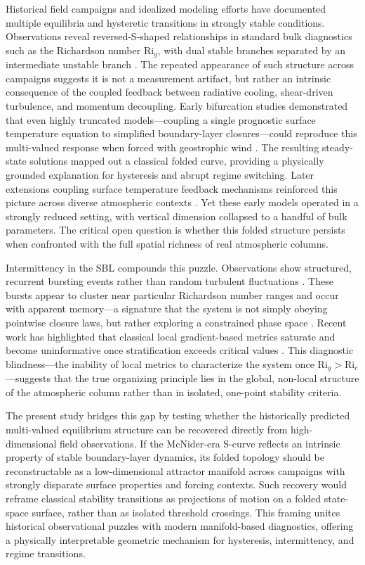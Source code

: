 \documentclass[12pt,a4paper]{article}
\newcommand{\Ric}{\mathrm{Ri}_c}
\newcommand{\Rig}{\mathrm{Ri}_g}
\begin{document}
Historical field campaigns and idealized modeling efforts have documented multiple equilibria and hysteretic transitions in strongly stable conditions. Observations reveal reversed-S-shaped relationships in standard bulk diagnostics such as the Richardson number $\Rig$, with dual stable branches separated by an intermediate unstable branch \citep{mcnider1993, mcnider1995}. The repeated appearance of such structure across campaigns suggests it is not a measurement artifact, but rather an intrinsic consequence of the coupled feedback between radiative cooling, shear-driven turbulence, and momentum decoupling. Early bifurcation studies demonstrated that even highly truncated models---coupling a single prognostic surface temperature equation to simplified boundary-layer closures---could reproduce this multi-valued response when forced with geostrophic wind \citep{mcnider1995, biazar1995}. The resulting steady-state solutions mapped out a classical folded curve, providing a physically grounded explanation for hysteresis and abrupt regime switching. Later extensions coupling surface temperature feedback mechanisms reinforced this picture across diverse atmospheric contexts \citep{mcnider2012}. Yet these early models operated in a strongly reduced setting, with vertical dimension collapsed to a handful of bulk parameters. The critical open question is whether this folded structure persists when confronted with the full spatial richness of real atmospheric columns.

Intermittency in the SBL compounds this puzzle. Observations show structured, recurrent bursting events rather than random turbulent fluctuations \citep{acevedo2001, poveda1993}. These bursts appear to cluster near particular Richardson number ranges and occur with apparent memory---a signature that the system is not simply obeying pointwise closure laws, but rather exploring a constrained phase space \citep{stull1988}. Recent work has highlighted that classical local gradient-based metrics saturate and become uninformative once stratification exceeds critical values \citep{vandewiel2017, vignon2017}. This diagnostic blindness---the inability of local metrics to characterize the system once $\Rig > \Ric$---suggests that the true organizing principle lies in the global, non-local structure of the atmospheric column rather than in isolated, one-point stability criteria.

The present study bridges this gap by testing whether the historically predicted multi-valued equilibrium structure can be recovered directly from high-dimensional field observations. If the McNider-era S-curve reflects an intrinsic property of stable boundary-layer dynamics, its folded topology should be reconstructable as a low-dimensional attractor manifold across campaigns with strongly disparate surface properties and forcing contexts. Such recovery would reframe classical stability transitions as projections of motion on a folded state-space surface, rather than as isolated threshold crossings. This framing unites historical observational puzzles with modern manifold-based diagnostics, offering a physically interpretable geometric mechanism for hysteresis, intermittency, and regime transitions.
\end{document}
